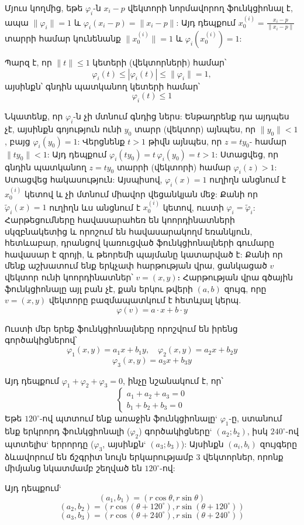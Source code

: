 \documentclass[12pt,a4paper]{article}
\numberwithin{equation}{section}
\numberwithin{figure}{section}
\begin{document}
Մյուս կողմից, եթե $\varphi_i$-ն $x_i-p$ վեկտորի նորմավորող ֆունկցիոնալ է, ապա $\|\varphi_i\| = 1$ և $\varphi_i(x_i-p) = \|x_i-p\|$: Այդ դեպքում $x_0^{(i)} = \frac{x_i-p}{\|x_i-p\|}$ տարրի համար կունենանք $\|x_0^{(i)}\| = 1$ և $\varphi_i(x_0^{(i)}) = 1$:

Պարզ է, որ $\|t\| \leq 1$ կետերի (վեկտորների) համար՝
$$\varphi_i(t) \leq |\varphi_i(t)| \leq \|\varphi_i\| = 1,$$
այսինքն՝ գնդին պատկանող կետերի համար՝
$$\varphi_i(t) \leq 1$$

Նկատենք, որ $\varphi_i$-ն չի մտնում գնդից ներս: Ենթադրենք դա այդպես չէ, այսինքն գոյություն ունի $y_0$ տարր (վեկտոր) այնպես, որ $\|y_0\| < 1$, բայց $\varphi_i(y_0) = 1$: Վերցնենք $t > 1$ թիվն այնպես, որ $z = t y_0$- համար $\|t y_0\| < 1$: Այդ դեպքում $\varphi_i(t y_0) = t \, \varphi_i(y_0) = t > 1$: Ստացվեց, որ գնդին պատկանող $z = t y_0$ տարրի (վեկտորի) համար $\varphi_i(z) > 1$: Ստացվեց հակասություն: Այսպիսով, $\varphi_i(x) = 1$ ուղիղն անցնում է $x_0^{(i)}$ կետով և չի մտնում միավոր վեցանկյան մեջ: Քանի որ $\tilde{\varphi}_i(x) = 1$ ուղիղն ևս անցնում է $x_0^{(i)}$ կետով, ուստի $\varphi_i = \tilde{\varphi}_i$: Հարթեցումները հավասարահեռ են կոորդինատների սկզբնակետից և որոշում են հավասարակողմ եռանկյուն, հետևաբար, դրանցով կառուցված ֆունկցիոնալների գումարը հավասար է զրոյի, և թեորեմի պայմանը կատարված է: Քանի որ մենք աշխատում ենք երկչափ հարթության վրա, ցանկացած $v$ վեկտոր ունի կոորդինատներ՝ $v = (x, y)$։ Հարթության վրա գծային ֆունկցիոնալը այլ բան չէ, քան երկու թվերի $(a, b)$ զույգ, որը $v = (x, y)$ վեկտորը բազմապատկում է հետևյալ կերպ.
$$\varphi(v) = a \cdot x + b \cdot y$$

Ուստի մեր երեք ֆունկցիոնալները որոշվում են իրենց գործակիցներով՝
$$\varphi_1(x, y) = a_1 x + b_1 y, \quad \varphi_2(x, y) = a_2 x + b_2 y$$
$$\varphi_3(x, y) = a_3 x + b_3 y$$

Այդ դեպքում $\varphi_1 + \varphi_2 + \varphi_3 = 0$, ինչը նշանակում է, որ՝
$$\begin{cases} 
a_1 + a_2 + a_3 = 0 \\ 
b_1 + b_2 + b_3 = 0 
\end{cases}$$
Եթե $120^{\circ}$-ով պտտում ենք առաջին ֆունկցիոնալը` $\varphi_1$-ը, ստանում ենք երկրորդ ֆունկցիոնալի ($\varphi_2$) գործակիցները` $(a_2; b_2)$, իսկ $240^{\circ}$-ով պտտելիս` երրորդը ($\varphi_3$, այսինքն` $(a_3; b_3)$): Այսինքն $(a_i, b_i)$ զույգերը ձևավորում են ճշգրիտ նույն երկարությամբ $3$ վեկտորներ, որոնք միմյանց նկատմամբ շեղված են $120^{\circ}$-ով:

Այդ դեպքում`
\begin{equation*}
(a_1, b_1) = (r \cos \theta, r \sin \theta)
\end{equation*}
\begin{equation*}
(a_2, b_2) = (r \cos(\theta + 120^{\circ}), r \sin(\theta + 120^{\circ}))
\end{equation*}
\begin{equation*}
(a_3, b_3) = (r \cos(\theta + 240^{\circ}), r \sin(\theta + 240^{\circ}))
\end{equation*}
\end{document}
